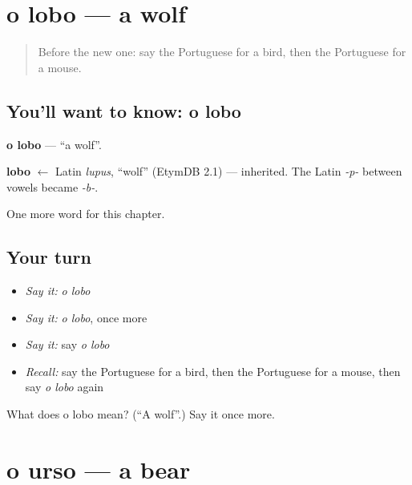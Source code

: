 \section[o lobo]{o lobo — a wolf}

\label{lesson:PT-C61-lobo}



\begin{quote}
Before the new one: say the Portuguese for a bird, then the Portuguese for a mouse.
\end{quote}

\subsection*{You'll want to know: o lobo}
\textbf{o lobo} — \textquotedblleft{}a wolf\textquotedblright{}.

\begin{cousinweb}
\textbf{lobo} $\leftarrow$ Latin \emph{lupus}, \textquotedblleft{}wolf\textquotedblright{} (EtymDB 2.1) — inherited. The Latin \emph{-p-} between vowels became \emph{-b-}.
\end{cousinweb}

\begin{grammarlens}[title={What you've built}]
One more word for this chapter.
\end{grammarlens}

\subsection*{Your turn}
\begin{itemize}
\raggedright
  \item \emph{Say it:} \emph{o lobo}
  \item \emph{Say it:} \emph{o lobo}, once more
  \item \emph{Say it:} say \emph{o lobo}
  \item \emph{Recall:} say the Portuguese for a bird, then the Portuguese for a mouse, then say \emph{o lobo} again
\end{itemize}

\begin{tcolorbox}[breakable,colback=teal!4,colframe=teal!35!black,title={Before you move on}]
What does o lobo mean? (\textquotedblleft{}A wolf\textquotedblright{}.) Say it once more.
\end{tcolorbox}
\section[o urso]{o urso — a bear}

